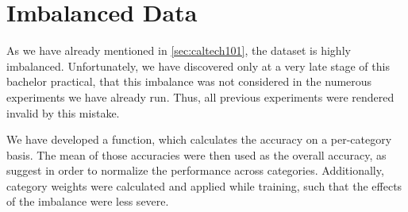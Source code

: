 \documentclass[a4paper, 11pt]{article}
\begin{document}
\clearpage


\appendix
\section{Imbalanced Data} \label{app:imbalance}
As we have already mentioned in \cref{sec:caltech101}, the dataset is highly imbalanced.
Unfortunately, we have discovered only at a very late stage of this bachelor practical, that this imbalance was not considered in the numerous experiments we have already run.
Thus, all previous experiments were rendered invalid by this mistake.

We have developed a function, which calculates the accuracy on a per-category basis.
The mean of those accuracies were then used as the overall accuracy, as \citet{Fei-Fei2007} suggest in order to normalize the performance across categories.
Additionally, category weights were calculated and applied while training, such that the effects of the imbalance were less severe.
\end{document}
